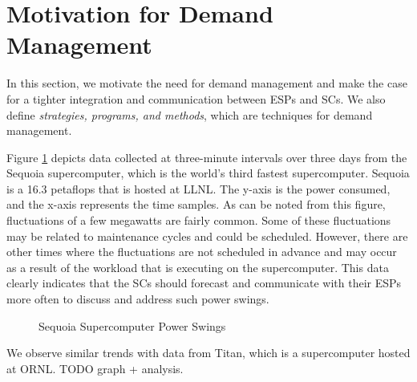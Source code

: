 \section{Motivation for Demand Management}
\label{strategies}

In this section, we motivate the need for demand management and make the case for a tighter integration and communication between ESPs and SCs. We also define \emph{strategies, programs, and methods}, which are techniques for demand management. 

Figure \ref{fig:seq} depicts data collected at three-minute intervals over three days from the Sequoia supercomputer, which is the world's third fastest supercomputer. Sequoia is a 16.3 petaflops that is hosted at LLNL. The y-axis is the power consumed, and the x-axis represents the time samples. As can be noted from this figure, fluctuations of a few megawatts are fairly common. Some of these fluctuations may be related to maintenance cycles and could be scheduled. However, there are other times where the fluctuations are not scheduled in advance and may occur as a result of the workload that is executing on the supercomputer. This data clearly indicates that the SCs should forecast and communicate with their ESPs more often to discuss and address such power swings. \\

\begin{figure}
\begin{center}
\caption{Sequoia Supercomputer Power Swings}
\label{fig:seq}
\end{center}
\end{figure}

We observe similar trends with data from Titan, which is a supercomputer hosted at ORNL. TODO graph + analysis. \\


